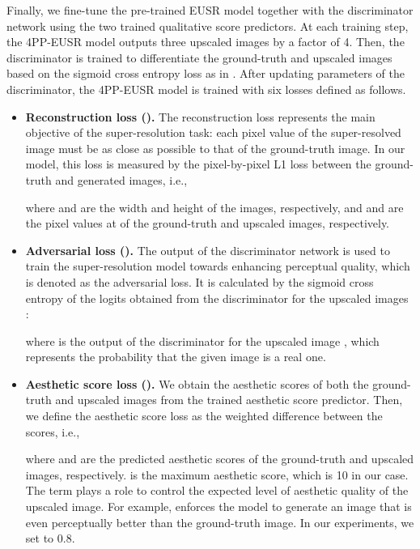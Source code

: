 \documentclass[runningheads]{llncs}
\begin{document}
Finally, we fine-tune the pre-trained EUSR model together with the discriminator network using the two trained qualitative score predictors.
At each training step, the 4PP-EUSR model outputs three upscaled images by a factor of 4.
Then, the discriminator is trained to differentiate the ground-truth and upscaled images based on the sigmoid cross entropy loss as in \cite{ledig2017photo}.
After updating parameters of the discriminator, the 4PP-EUSR model is trained with six losses defined as follows.
\begin{itemize}
	\item \textbf{Reconstruction loss ().}
	The reconstruction loss represents the main objective of the super-resolution task: each pixel value of the super-resolved image must be as close as possible to that of the ground-truth image.
	In our model, this loss is measured by the pixel-by-pixel L1 loss between the ground-truth and generated images, i.e.,
	
	where  and  are the width and height of the images, respectively, and  and  are the pixel values at  of the ground-truth and upscaled images, respectively.\\
	
	\item \textbf{Adversarial loss ().}
	The output of the discriminator network is used to train the super-resolution model towards enhancing perceptual quality, which is denoted as the adversarial loss.
	It is calculated by the sigmoid cross entropy of the logits obtained from the discriminator for the upscaled images \cite{ledig2017photo}:
	
	where  is the output of the discriminator for the upscaled image , which represents the probability that the given image is a real one.\\
	
	\item \textbf{Aesthetic score loss ().}
	We obtain the aesthetic scores of both the ground-truth and upscaled images from the trained aesthetic score predictor.
	Then, we define the aesthetic score loss as the weighted difference between the scores, i.e.,
	
	where  and  are the predicted aesthetic scores of the ground-truth and upscaled images, respectively.
	 is the maximum aesthetic score, which is 10 in our case.
	The term  plays a role to control the expected level of aesthetic quality of the upscaled image.
	For example,  enforces the model to generate an image that is even perceptually better than the ground-truth image.
	In our experiments, we set  to 0.8.\\
	

\end{itemize}
\end{document}
